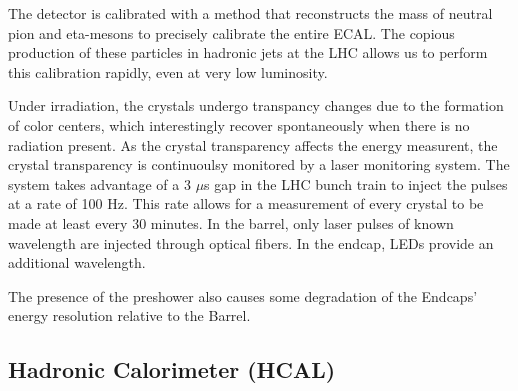 The detector is calibrated with a method that reconstructs the mass of neutral
pion and eta-mesons to precisely calibrate the entire ECAL. The copious
production of these particles in hadronic jets at the LHC allows us to
perform this calibration rapidly, even at very low luminosity.

Under irradiation, the crystals undergo transpancy changes 
due to the formation of color centers, which interestingly recover spontaneously when there
is no radiation present. As the crystal transparency affects the energy measurent,
the crystal transparency is continuoulsy monitored by a laser monitoring system. 
The system takes advantage of a 3 $\mu$s gap in the LHC bunch train to inject the
pulses at a rate of 100 Hz. This rate allows for a measurement of every crystal
to be made at least every 30 minutes. In the barrel, only laser
 pulses of known wavelength are injected through optical fibers. In the endcap, LEDs provide
an additional wavelength. 

The presence of the preshower also causes some degradation of the
Endcaps' energy resolution relative to the Barrel. 



\subsection{Hadronic Calorimeter (HCAL)}


